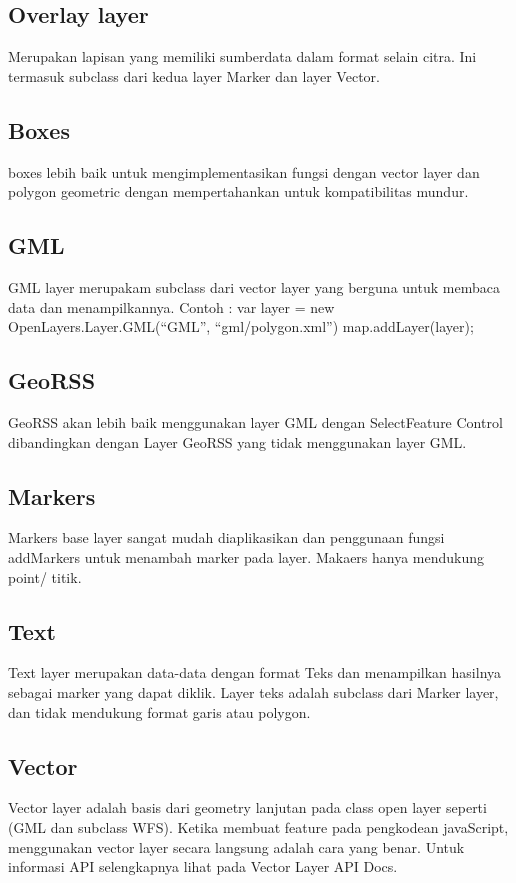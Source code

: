 \subsection {Overlay layer}
Merupakan lapisan yang memiliki sumberdata dalam format selain citra. Ini termasuk subclass dari kedua layer Marker dan layer Vector.

\subsection {Boxes}
boxes lebih baik untuk mengimplementasikan fungsi dengan vector layer dan polygon geometric dengan mempertahankan untuk kompatibilitas mundur.

\subsection {GML}
GML layer merupakam subclass dari vector layer yang berguna untuk membaca data dan menampilkannya. 
Contoh :
var layer = new OpenLayers.Layer.GML(“GML”, “gml/polygon.xml”)
map.addLayer(layer);

\subsection {GeoRSS}
GeoRSS akan  lebih baik menggunakan layer GML dengan SelectFeature Control dibandingkan dengan Layer GeoRSS yang tidak menggunakan layer GML.

\subsection {Markers}
Markers base layer sangat mudah diaplikasikan dan penggunaan fungsi addMarkers untuk menambah marker pada layer. Makaers hanya mendukung point/ titik.

\subsection {Text}
Text layer merupakan data-data dengan format Teks dan menampilkan hasilnya sebagai marker yang dapat diklik. Layer teks adalah subclass dari Marker layer, dan tidak mendukung format garis atau polygon.

\subsection {Vector}
Vector layer adalah basis dari geometry lanjutan pada class open layer seperti (GML dan subclass WFS). Ketika membuat feature pada pengkodean javaScript, menggunakan vector layer secara langsung adalah cara yang benar.
Untuk informasi API selengkapnya lihat pada Vector Layer API Docs.
